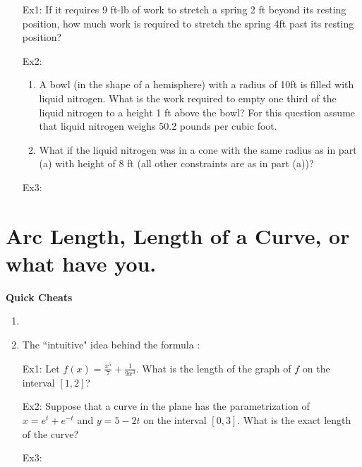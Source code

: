 \documentclass[12pt]{amsart}
\theoremstyle{plain}
\theoremstyle{definition}
\begin{document}
\begin{enumerate}
\setlength{\itemsep}{200pt}
\item[Ex1:] If it requires 9 ft-lb of work to stretch a spring 2 ft beyond its resting position, how much work is required to stretch the spring 4ft past its resting position?                  
\item[Ex2:] 
   \begin{enumerate}
   \item A bowl (in the shape of a hemisphere) with a radius of 10ft is filled with liquid nitrogen. What is the work required to empty one third of the liquid nitrogen to a height 1 ft above the bowl? For this question assume that liquid nitrogen weighs 50.2 pounds per cubic foot. 
   \item What if the liquid nitrogen was in a cone with the same radius as in part (a) with height of 8 ft (all other constraints are as in part (a))?
   \end{enumerate}
\item[Ex3:] 
\item[]
\end{enumerate}

\section*{Arc Length, Length of a Curve, or what have you.}              

\begin{mdframed}[style=MyFrame]
\begin{center}                 
\textbf{Quick Cheats}
\begin{enumerate}
\item 
\item The ``intuitive" idea behind the formula : 
\end{enumerate}
\end{center}                  

\end{mdframed}

\begin{enumerate}
\setlength{\itemsep}{200pt} 
\item[Ex1:] Let $f(x)= \frac{x^5}{7} + \frac{1}{9x^3}$. What is the length of the graph of $f$ on the interval $[1,2]$?     
\item[Ex2:] Suppose that a curve in the plane has the parametrization of $x= e^t + e^{-t}$ and $y= 5 -2t$ on the interval $[0,3]$. What is the exact length of the curve?                  
\item[Ex3:]   
\item[]  
\end{enumerate}  
\end{document}
